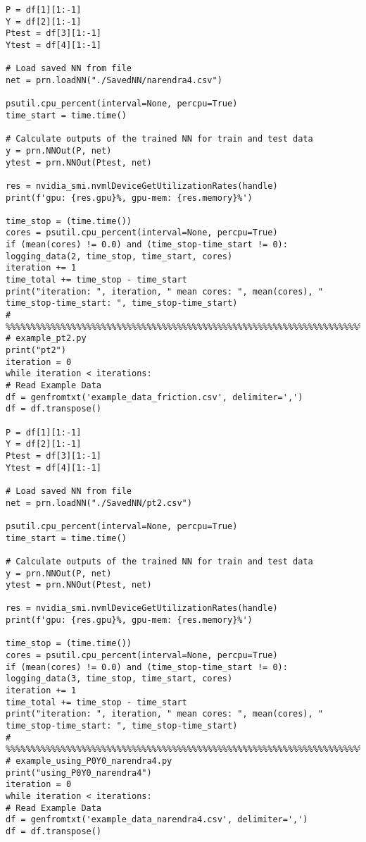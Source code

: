 \begin{lstlisting}
P = df[1][1:-1]
Y = df[2][1:-1]
Ptest = df[3][1:-1]
Ytest = df[4][1:-1]

# Load saved NN from file
net = prn.loadNN("./SavedNN/narendra4.csv")

psutil.cpu_percent(interval=None, percpu=True)
time_start = time.time()

# Calculate outputs of the trained NN for train and test data
y = prn.NNOut(P, net)
ytest = prn.NNOut(Ptest, net)

res = nvidia_smi.nvmlDeviceGetUtilizationRates(handle)
print(f'gpu: {res.gpu}%, gpu-mem: {res.memory}%')

time_stop = (time.time())
cores = psutil.cpu_percent(interval=None, percpu=True)
if (mean(cores) != 0.0) and (time_stop-time_start != 0):
logging_data(2, time_stop, time_start, cores)
iteration += 1
time_total += time_stop - time_start
print("iteration: ", iteration, " mean cores: ", mean(cores), " time_stop-time_start: ", time_stop-time_start)
# %%%%%%%%%%%%%%%%%%%%%%%%%%%%%%%%%%%%%%%%%%%%%%%%%%%%%%%%%%%%%%%%%%%%%%%%%%%%%%%%%%%%%%%
# example_pt2.py
print("pt2")
iteration = 0
while iteration < iterations:
# Read Example Data
df = genfromtxt('example_data_friction.csv', delimiter=',')
df = df.transpose()

P = df[1][1:-1]
Y = df[2][1:-1]
Ptest = df[3][1:-1]
Ytest = df[4][1:-1]

# Load saved NN from file
net = prn.loadNN("./SavedNN/pt2.csv")

psutil.cpu_percent(interval=None, percpu=True)
time_start = time.time()

# Calculate outputs of the trained NN for train and test data
y = prn.NNOut(P, net)
ytest = prn.NNOut(Ptest, net)

res = nvidia_smi.nvmlDeviceGetUtilizationRates(handle)
print(f'gpu: {res.gpu}%, gpu-mem: {res.memory}%')

time_stop = (time.time())
cores = psutil.cpu_percent(interval=None, percpu=True)
if (mean(cores) != 0.0) and (time_stop-time_start != 0):
logging_data(3, time_stop, time_start, cores)
iteration += 1
time_total += time_stop - time_start
print("iteration: ", iteration, " mean cores: ", mean(cores), " time_stop-time_start: ", time_stop-time_start)
# %%%%%%%%%%%%%%%%%%%%%%%%%%%%%%%%%%%%%%%%%%%%%%%%%%%%%%%%%%%%%%%%%%%%%%%%%%%%%%%%%%%%%%%
# example_using_P0Y0_narendra4.py
print("using_P0Y0_narendra4")
iteration = 0
while iteration < iterations:
# Read Example Data
df = genfromtxt('example_data_narendra4.csv', delimiter=',')
df = df.transpose()


\end{lstlisting}
